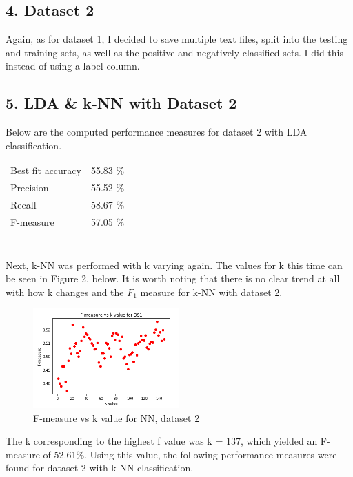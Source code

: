 \documentclass[11pt]{article}
\begin{document}
\subsection*{4. Dataset 2}
Again, as for dataset 1, I decided to save multiple text files, split into the testing and training sets, as well as the positive and negatively classified sets. I did this instead of using a label column.

\subsection*{5. LDA \& k-NN with Dataset 2}
Below are the computed performance measures for dataset 2 with LDA classification.\\
\begin{tabular}{llllll}
Best fit accuracy & 55.83 \% &  &  &  &  \\
Precision         & 55.52 \% &  &  &  &  \\
Recall            & 58.67 \% &  &  &  &  \\
F-measure         & 57.05 \% &  &  &  &  \\
                  &          &  &  &  &  \\
\end{tabular}\\

Next, k-NN was performed with k varying again. The values for k this time can be seen in Figure 2, below. It is worth noting that there is no clear trend at all with how k changes and the $F_1$ measure for k-NN with dataset 2.
\begin{figure}[h]
\centering
\includegraphics[width=0.5\textwidth]{ds2_f_k}
\caption{F-measure vs k value for NN, dataset 2}
\end{figure}

The k corresponding to the highest f value was k = 137, which yielded an F-measure of 52.61\%. Using this value, the following performance measures were found for dataset 2 with k-NN classification.
\end{document}
